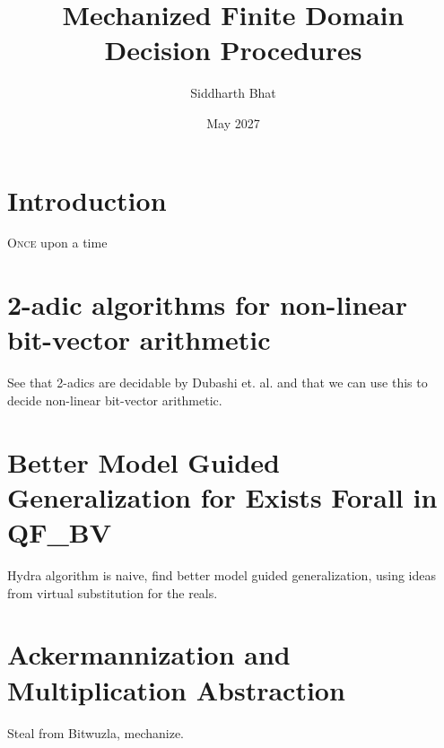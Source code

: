 \documentclass[withindex,glossary]{cam-thesis}
\title{Mechanized  Finite Domain Decision Procedures}
\author{Siddharth Bhat}
\date{May 2027}
\begin{document}
\frontmatter{}



\chapter{Introduction}

\lettrine{O}{nce} upon a time
% 
% 
 

\chapter{2-adic algorithms for non-linear bit-vector arithmetic}

See that 2-adics are decidable by Dubashi et. al. and that we can use this to
decide non-linear bit-vector arithmetic.


\chapter{Better Model Guided Generalization for Exists Forall in QF\_BV}

Hydra algorithm is naive, find better model guided generalization,
using ideas from virtual substitution for the reals.

\chapter{Ackermannization and Multiplication Abstraction}
Steal from Bitwuzla, mechanize.
\end{document}
